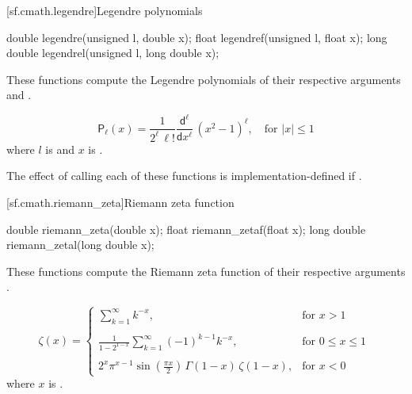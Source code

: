 [sf.cmath.legendre]{Legendre polynomials}%
%
%
%
%
%
\begin{itemdecl}
double       legendre(unsigned l, double x);
float        legendref(unsigned l, float x);
long double  legendrel(unsigned l, long double x);
\end{itemdecl}

\begin{itemdescr}

\pnum\effects
These functions compute the Legendre polynomials of their
respective arguments
 and .

\pnum\returns
\[%
  \mathsf{P}_\ell(x) =
  \frac{1}
       {2^\ell \, \ell!}
  \frac{ \mathsf{d} ^ \ell}
       { \mathsf{d}x ^ \ell} \, (x^2 - 1) ^ \ell,
	   \quad \mbox{for $|x| \le 1$}
\]
where
$l$ is  and
$x$ is .

\pnum\remark
The effect of calling each of these functions
is implementation-defined
if .
\end{itemdescr}

[sf.cmath.riemann_zeta]{Riemann zeta function}%
%
%
%
%
\begin{itemdecl}
double       riemann_zeta(double x);
float        riemann_zetaf(float x);
long double  riemann_zetal(long double x);
\end{itemdecl}

\begin{itemdescr}

\pnum\effects
These functions compute the Riemann zeta function
of their respective arguments
.

\pnum\returns
\[%
  \mathsf{\zeta}(x) =
  \left\{
  \begin{array}{cl}
  \displaystyle
  \sum_{k=1}^\infty k^{-x},
  & \mbox{for $x > 1$}
  \\
  \\
  \displaystyle
  \frac{1}
	{1 - 2^{1-x}}
  \sum_{k=1}^\infty (-1)^{k-1} k^{-x},
  & \mbox{for $0 \le x \le 1$}
  \\
  \\
  \displaystyle
  2^x \pi^{x-1} \sin(\frac{\pi x}{2}) \, \Gamma(1-x) \, \zeta(1-x),
  & \mbox{for $x < 0$}
  \end{array}
  \right.
\;
\]
where
$x$ is .
\end{itemdescr}

